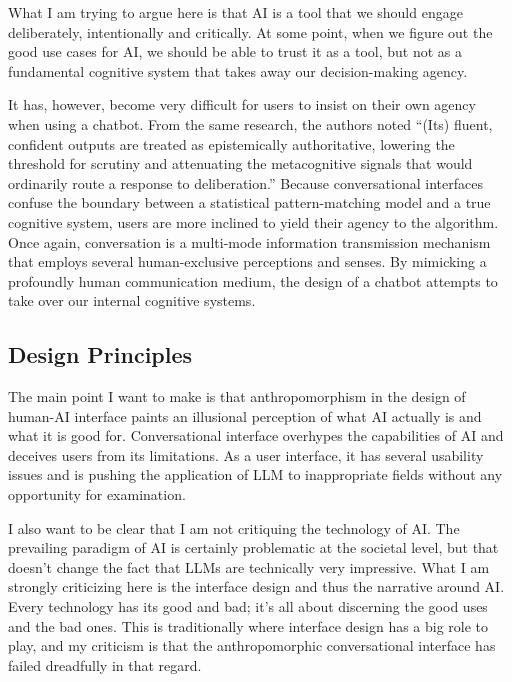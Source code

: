 \documentclass[12pt]{article}
\begin{document}
What I am trying to argue here is that AI is a tool that we should engage deliberately, intentionally and critically. At some point, when we figure out the good use cases for AI, we should be able to trust it as a tool, but not as a fundamental cognitive system that takes away our decision-making agency.

It has, however, become very difficult for users to insist on their own agency when using a chatbot. From the same research, the authors noted ``(Its) fluent, confident outputs are treated as epistemically authoritative, lowering the threshold for scrutiny and attenuating the metacognitive signals that would ordinarily route a response to deliberation.'' Because conversational interfaces confuse the boundary between a statistical pattern-matching model and a true cognitive system, users are more inclined to yield their agency to the algorithm. Once again, conversation is a multi-mode information transmission mechanism that employs several human-exclusive perceptions and senses. By mimicking a profoundly human communication medium, the design of a chatbot attempts to take over our internal cognitive systems.

\subsection{Design Principles}
The main point I want to make is that anthropomorphism in the design of human-AI interface paints an illusional perception of what AI actually is and what it is good for. Conversational interface overhypes the capabilities of AI and deceives users from its limitations. As a user interface, it has several usability issues and is pushing the application of LLM to inappropriate fields without any opportunity for examination.

I also want to be clear that I am not critiquing the technology of AI. The prevailing paradigm of AI is certainly problematic at the societal level, but that doesn't change the fact that LLMs are technically very impressive. What I am strongly criticizing here is the interface design and thus the narrative around AI. Every technology has its good and bad; it's all about discerning the good uses and the bad ones. This is traditionally where interface design has a big role to play, and my criticism is that the anthropomorphic conversational interface has failed dreadfully in that regard.
\end{document}

